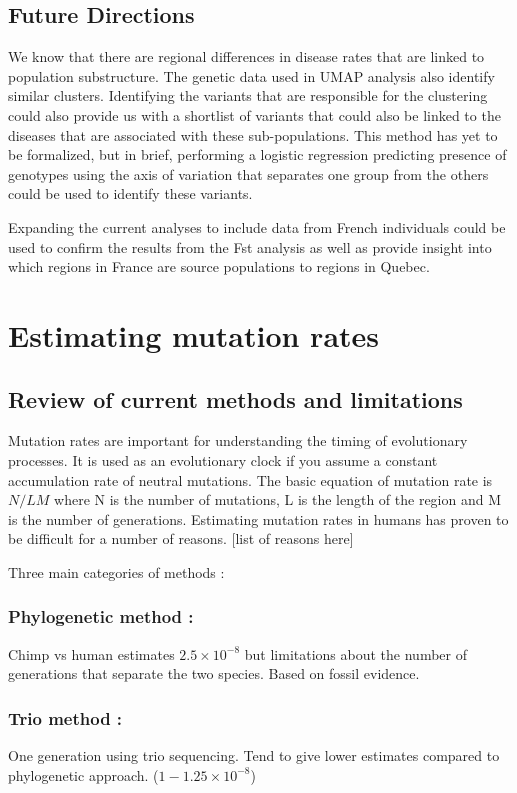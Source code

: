 \documentclass[
11pt, %
oneside, %
english, %
doublespacing, %
headsepline, %
]{MastersDoctoralThesis} %
\begin{document}
\section{Future Directions}
We know that there are regional differences in disease rates that are linked to population substructure.
The genetic data used in UMAP analysis also identify similar clusters.
Identifying the variants that are responsible for the clustering could also provide us with a shortlist of variants that could also be linked to the diseases that are associated with these sub-populations.
This method has yet to be formalized, but in brief, performing a logistic regression predicting presence of genotypes using the axis of variation that separates one group from the others could be used to identify these variants.

Expanding the current analyses to include data from French individuals could be used to confirm the results from the Fst analysis as well as provide insight into which regions in France are source populations to regions in Quebec. 

\chapter{Estimating mutation rates}

\section{Review of current methods and limitations}

Mutation rates are important for understanding the timing of evolutionary processes.
It is used as an evolutionary clock if you assume a constant accumulation rate of neutral mutations.
The basic equation of mutation rate is $N / LM$ where N is the number of mutations, L is the length of the region and M is the number of generations.
Estimating mutation rates in humans has proven to be difficult for a number of reasons.
[list of reasons here]

Three main categories of methods :

\subsection{Phylogenetic method :} Chimp vs human estimates $2.5\times10^{-8}$ but limitations about the number of generations that separate the two species. Based on fossil evidence.

\subsection{Trio method :} One generation using trio sequencing. 
Tend to give lower estimates compared to phylogenetic approach. ($1-1.25\times10^{-8}$)
\end{document}
